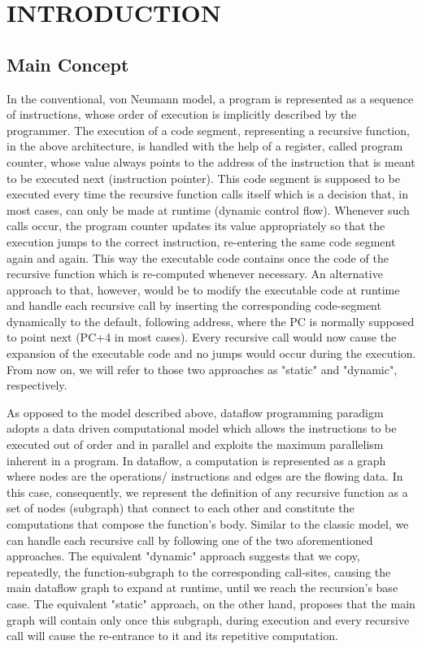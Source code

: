 \documentclass[ack,preface]{dithesis}
\begin{document}
\frontmatter

\mainmatter

\chapter{INTRODUCTION}
    \section{Main Concept}
	In the conventional, von Neumann model, a program is represented as a sequence of instructions, whose order of execution is implicitly described by the programmer.
The execution of a code segment, representing a recursive function, in the above architecture, is handled with the help of a register, called program counter, whose value always points to the address of the instruction that is meant to be executed next (instruction pointer). This code segment is supposed to be executed every time the recursive function calls itself which is a decision that, in most cases, can only be made at runtime (dynamic control flow). Whenever such calls occur, the program counter updates its value appropriately so that the execution jumps to the correct instruction, re-entering the same code segment again and again. This way the executable code contains once the code of the recursive function which is re-computed whenever necessary. An alternative approach to that, however, would be to modify the executable code at runtime  and handle each recursive call by inserting the corresponding code-segment dynamically to the default, following address, where the PC is normally supposed to point next (PC+4 in most cases). Every recursive call would now cause the expansion of the executable code and no jumps would occur during the execution.
From now on, we will refer to those two approaches as "static" and "dynamic", respectively.

As opposed to the model described above, dataflow programming paradigm adopts a data driven computational model which allows the instructions to be executed out of order and in parallel and exploits the maximum parallelism inherent in a program. In dataflow, a computation is represented as a graph where nodes are the operations/ instructions and edges are the flowing data. 
In this case, consequently, we represent the definition of any recursive function as  a set of nodes (subgraph) that connect to each other and constitute the computations that compose the function’s body. Similar to the classic model, we can handle each recursive call by following one of the two aforementioned approaches. 
 The equivalent "dynamic" approach suggests that we copy, repeatedly, the function-subgraph to the corresponding call-sites, causing the main dataflow graph to expand at runtime, until we reach the recursion's base case. The equivalent "static" approach, on the other hand, proposes that the main graph will contain only once this subgraph, during execution and every recursive call will cause the re-entrance to it and its repetitive computation.
\end{document}
